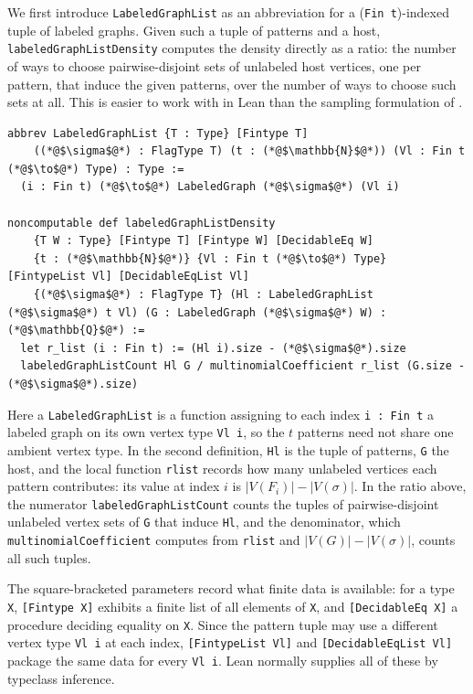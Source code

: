 \documentclass[acmsmall,screen=true,acmthm=false]{acmart}
\DeclareRobustCommand{\lean}[1]{{\def\_{\textunderscore\allowbreak}\texttt{#1}}}
\begin{document}
We first introduce \lean{LabeledGraphList} as an abbreviation for a
(\lean{Fin t})-indexed tuple of labeled graphs.  Given such a tuple of
patterns and a host, \lean{labeledGraphListDensity} computes the density
directly as a ratio: the number of ways to choose pairwise-disjoint sets of
unlabeled host vertices, one per pattern, that induce the given patterns, over
the number of ways to choose such sets at all.  This is easier to work with in
Lean than the sampling formulation of .
\begin{lstlisting}
abbrev LabeledGraphList {T : Type} [Fintype T]
    ((*@$\sigma$@*) : FlagType T) (t : (*@$\mathbb{N}$@*)) (Vl : Fin t (*@$\to$@*) Type) : Type :=
  (i : Fin t) (*@$\to$@*) LabeledGraph (*@$\sigma$@*) (Vl i)

noncomputable def labeledGraphListDensity
    {T W : Type} [Fintype T] [Fintype W] [DecidableEq W]
    {t : (*@$\mathbb{N}$@*)} {Vl : Fin t (*@$\to$@*) Type} [FintypeList Vl] [DecidableEqList Vl]
    {(*@$\sigma$@*) : FlagType T} (Hl : LabeledGraphList (*@$\sigma$@*) t Vl) (G : LabeledGraph (*@$\sigma$@*) W) : (*@$\mathbb{Q}$@*) :=
  let r_list (i : Fin t) := (Hl i).size - (*@$\sigma$@*).size
  labeledGraphListCount Hl G / multinomialCoefficient r_list (G.size - (*@$\sigma$@*).size)
\end{lstlisting}
Here a \lean{LabeledGraphList} is a function assigning to each index
\lean{i : Fin t} a labeled graph on its own vertex type \lean{Vl i}, so the
$t$ patterns need not share one ambient vertex type.  In the second
definition, \lean{Hl} is the tuple of patterns, \lean{G} the host, and the
local function \lean{r\_list} records how many unlabeled vertices each pattern
contributes: its value at index $i$ is \(|V(F_i)| - |V(\sigma)|\).  In the
ratio above, the numerator \lean{labeledGraphListCount} counts the tuples of
pairwise-disjoint unlabeled vertex sets of \lean{G} that induce \lean{Hl}, and
the denominator, which \lean{multinomialCoefficient} computes from
\lean{r\_list} and \(|V(G)| - |V(\sigma)|\), counts all such tuples.

The square-bracketed parameters record what finite data is available: for a
type \lean{X}, \lean{[Fintype X]} exhibits a finite list of all elements of
\lean{X}, and \lean{[DecidableEq X]} a procedure deciding equality on
\lean{X}.  Since the pattern tuple may use a different vertex type
\lean{Vl i} at each index, \lean{[FintypeList Vl]} and
\lean{[DecidableEqList Vl]} package the same data for every \lean{Vl i}.
Lean normally supplies all of these by typeclass inference.
\end{document}

